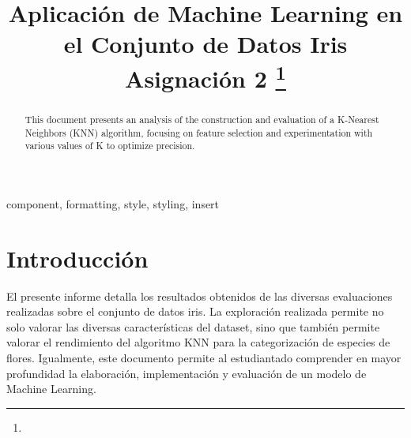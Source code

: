 \documentclass[conference]{IEEEtran}
\begin{document}
\title{Aplicación de Machine Learning en el Conjunto de Datos Iris\\
{\footnotesize \textsuperscript{}Asignación 2}
\thanks{}
}

\author{
}



\maketitle

\begin{abstract}
This document presents an analysis of the construction and evaluation of a K-Nearest Neighbors (KNN) algorithm, focusing on feature selection and experimentation with various values of K to optimize precision. 
\end{abstract}

\begin{IEEEkeywords}
component, formatting, style, styling, insert
\end{IEEEkeywords}

\section{Introducción}
El presente informe detalla los resultados obtenidos de las diversas evaluaciones realizadas sobre el conjunto de datos iris. La exploración realizada permite no solo valorar las diversas características del dataset, sino que también permite valorar el rendimiento del algoritmo KNN para la categorización de especies de flores. Igualmente, este documento permite al estudiantado comprender en mayor profundidad la elaboración, implementación y evaluación de un modelo de Machine Learning.
\end{document}
